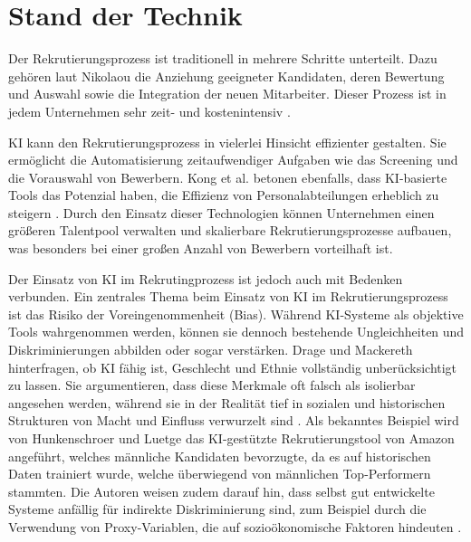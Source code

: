 
\chapter{Stand der Technik}
Der Rekrutierungsprozess ist traditionell in mehrere Schritte unterteilt. Dazu gehören laut Nikolaou die Anziehung geeigneter Kandidaten, deren Bewertung und Auswahl sowie die Integration der neuen Mitarbeiter. Dieser Prozess ist in jedem Unternehmen sehr zeit- und kostenintensiv \cite{nikolaou:2021}. 

\acs{KI} kann den Rekrutierungsprozess in vielerlei Hinsicht effizienter gestalten. Sie ermöglicht die Automatisierung zeitaufwendiger Aufgaben wie das Screening und die Vorauswahl von Bewerbern. Kong et al. betonen ebenfalls, dass \acs{KI}-basierte Tools das Potenzial haben, die Effizienz von Personalabteilungen erheblich zu steigern \cite{kong:2021}. Durch den Einsatz dieser Technologien können Unternehmen einen größeren Talentpool verwalten und skalierbare Rekrutierungsprozesse aufbauen, was besonders bei einer großen Anzahl von Bewerbern vorteilhaft ist.

Der Einsatz von \acs{KI} im Rekrutingprozess ist jedoch auch mit Bedenken verbunden. Ein zentrales Thema beim Einsatz von \acs{KI} im Rekrutierungsprozess ist das Risiko der Voreingenommenheit (Bias). Während \acs{KI}-Systeme als objektive Tools wahrgenommen werden, können sie dennoch bestehende Ungleichheiten und Diskriminierungen abbilden oder sogar verstärken. Drage und Mackereth hinterfragen, ob \acs{KI} fähig ist, Geschlecht und Ethnie vollständig unberücksichtigt zu lassen. Sie argumentieren, dass diese Merkmale oft falsch als isolierbar angesehen werden, während sie in der Realität tief in sozialen und historischen Strukturen von Macht und Einfluss verwurzelt sind \cite{drage:2022}. Als bekanntes Beispiel wird von Hunkenschroer und Luetge das \acs{KI}-gestützte Rekrutierungstool von Amazon angeführt, welches männliche Kandidaten bevorzugte, da es auf historischen Daten trainiert wurde, welche überwiegend von männlichen Top-Performern stammten. Die Autoren weisen zudem darauf hin, dass selbst gut entwickelte Systeme anfällig für indirekte Diskriminierung sind, zum Beispiel durch die Verwendung von Proxy-Variablen, die auf sozioökonomische Faktoren hindeuten \cite{hunkenschroer:2022}.

